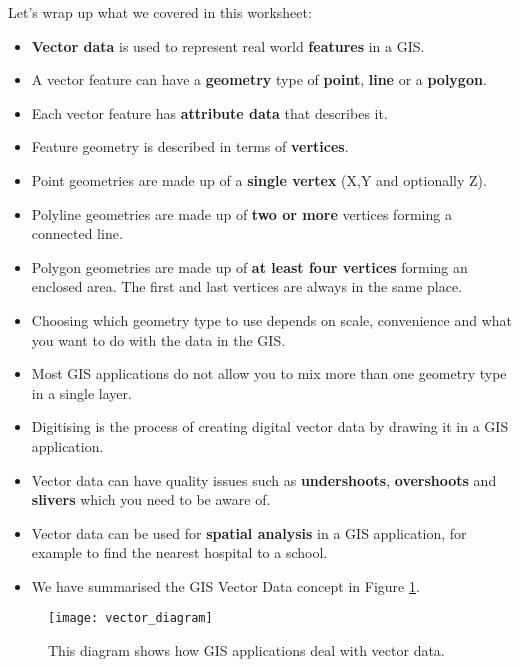 Let's wrap up what we covered in this worksheet:

\begin{itemize}
\item \textbf{Vector data} is used to represent real world \textbf{features} in a GIS.
\item A vector feature can have a \textbf{geometry} type of \textbf{point},
\textbf{line} or a \textbf{polygon}.
\item Each vector feature has \textbf{attribute data} that describes it.
\item Feature geometry is described in terms of \textbf{vertices}.
\item Point geometries are made up of a \textbf{single vertex} (X,Y and
optionally Z).
\item Polyline geometries are made up of \textbf{two or more} vertices
forming a connected line.
\item Polygon geometries are made up of \textbf{at least four vertices}
forming an enclosed area. The first and last vertices are always in the same
place.
\item Choosing which geometry type to use depends on scale, convenience and
what you want to do with the data in the GIS.
\item Most GIS applications do not allow you to mix more than one geometry
type in a single layer.
\item Digitising is the process of creating digital vector data by drawing it
in a GIS application.
\item Vector data can have quality issues such as \textbf{undershoots},
\textbf{overshoots} and \textbf{slivers} which you need to be aware of.
\item Vector data can be used for \textbf{spatial analysis} in a GIS
application, for example to find the nearest hospital to a school.
\item We have summarised the GIS Vector Data concept in Figure
\ref{fig:vectordiagram}.
\end{itemize}

\begin{figure}[htpb]
   \begin{center}
   \caption{This diagram shows how GIS applications deal with vector data.}
    \label{fig:vectordiagram}\smallskip
   \texttt{[image: vector\_diagram]}
\end{center}
\end{figure}

\newpage

